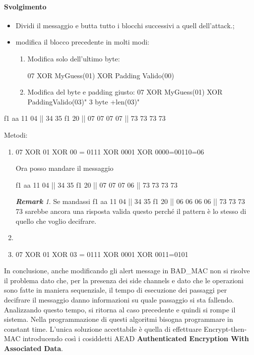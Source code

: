 \documentclass{article}
\theoremstyle{remark}
\newtheorem*{remark}{\textbf{Remark}}
\begin{document}
\paragraph{Svolgimento}
\begin{itemize}
	\item Dividi il messaggio  e butta tutto i blocchi successivi a quell dell'attack.;
	\item modifica il blocco precedente in molti modi:\begin{enumerate}
		      \item Modifica solo dell'ultimo byte:\begin{center}
			            07 XOR MyGuess(01) XOR Padding Valido(00)
		            \end{center}
		      \item Modifica del byte e padding giusto: 07 XOR MyGuess(01) XOR PaddingValido(03)" 3 byte +len(03)"
	      \end{enumerate}
\end{itemize}
\begin{center}
	f1 aa 11 04 || 34 35 f1 20 || 07 07 07 07 || 73 73 73 73
\end{center}
Metodi:\begin{enumerate}
	\item \begin{center}
		      07 XOR 01 XOR 00 = 0111 XOR 0001 XOR 0000=00110=06
	      \end{center}
	      Ora posso mandare il messaggio\begin{center}
		      f1 aa 11 04 || 34 35 f1 20 || 07 07 07 06 || 73 73 73 73
		      \begin{remark}
			      Se mandassi  f1 aa 11 04 || 34 35 f1 20 || 06 06 06 06 || 73 73 73 73 sarebbe ancora una risposta valida questo perché il pattern è lo stesso di quello che voglio decifrare.
		      \end{remark}\end{center}
	\item \item \begin{center}
		      07 XOR 01 XOR 03 = 0111 XOR 0001 XOR 0011=0101
	      \end{center}
\end{enumerate}
In conclusione, anche modificando gli alert message in BAD\_MAC non si risolve il problema dato che, per la presenza dei side channels e dato che le operazioni sono fatte in maniera sequenziale, il tempo di esecuzione dei passaggi per decifrare il messaggio danno informazioni su quale passaggio si sta fallendo. Analizzando questo tempo, si ritorna al caso precedente e quindi si rompe il sistema. Nella programmazione di questi algoritmi bisogna programmare in constant time.
L'unica soluzione accettabile è quella di effettuare Encrypt-then-MAC introducendo così i cosiddetti AEAD\textbf{ Authenticated Encryption With Associated Data}.
\end{document}
